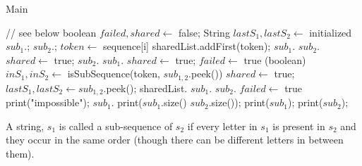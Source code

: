 \documentclass[12pt]{article}
\begin{document}
\begin{algorithm}[H]
\caption{Main}
\begin{algorithmic}
            \State {} // see below
            \State boolean $failed, shared \gets$ false; String $lastS_1, lastS_2 \gets$ initialized
            \State $sub_1$.; $sub_2$.;
                \State $token \gets$ sequence[i]
                        \State sharedList.addFirst(token);
                        \State $sub_1$.
                        \State $sub_2$.
                        \State $shared \gets$ true;
                        \State $sub_2$.
                        \State $sub_1$.
                        \State $shared \gets$ true;
                    \Else
                        $failed \gets$ true
                    \EndIf
                \Else
                    \State (boolean) $inS_1, inS_2 \gets$ isSubSequence(token, $sub_{1,2}$.peek())
                        \State $shared \gets$ true; $lastS_1, lastS_2\gets sub_{1,2}$.peek();
                        \State sharedList.
                        $sub_1$.
                        $sub_2$.
                    \Else
                        $failed \gets$ true
                    \EndIf
                \EndIf
            \EndFor
                print("impossible");
            \Else
                    $sub_1$.
                \EndIf
                \State print($sub_1$.size() $sub_2$.size()); print($sub_1$); print($sub_2$);
            \EndIf
        \EndFor
    \EndProcedure
\end{algorithmic}
\end{algorithm}
\newpage
A string, $s_1$ is called a sub-sequence of $s_2$ if every letter in $s_1$ is present in $s_2$ and they occur
in the same order (though there can be different letters in between them).
\end{document}

